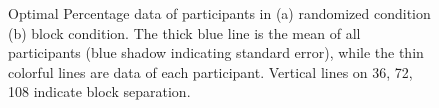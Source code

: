 \begin{figure}[ht]
\centering
{}
\decoRule
\caption[Optimal Percentage data of participants]{Optimal Percentage data of participants in (a) randomized condition (b) block condition. The thick blue line is the mean of all participants (blue shadow indicating standard error), while the thin colorful lines are data of each participant. Vertical lines on 36, 72, 108 indicate block separation. }
\label{fig:Optimal Percentage Participants}
\end{figure}

